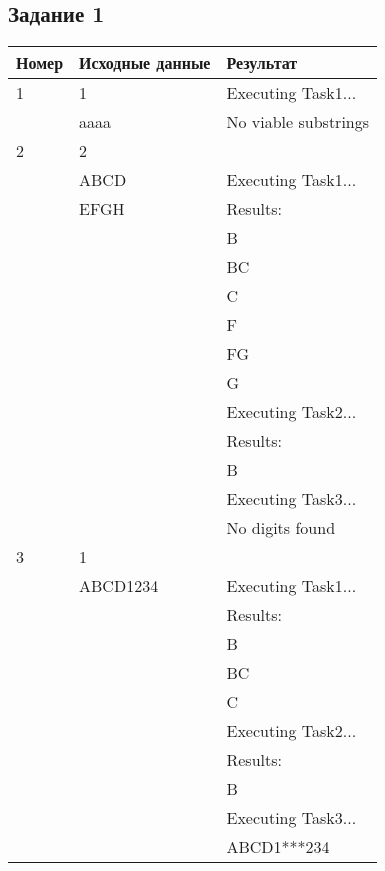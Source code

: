 \subsection*{\centering Задание 1}
\begin{table}[H]
    \centering
    \begin{tabular}{|l|l|l|}
        \hline
        Номер & Исходные данные & Результат\\[2ex] \hline
        1     & 1               & Executing Task1...\\
              & aaaa            & No viable substrings\\[2ex]\hline
        2     & 2               & \\
              & ABCD            & Executing Task1...\\
              & EFGH            & Results:\\
              &&B\\
              &&BC\\
              &&C\\
              &&F\\
              &&FG\\
              &&G\\
              &&Executing Task2...\\
              &&Results:\\
              &&B\\
              &&Executing Task3...\\
              &&No digits found\\[2ex]\hline
        3     & 1               & \\
              & ABCD1234        & Executing Task1...\\
              && Results:\\
              &&B\\
              &&BC\\
              &&C\\
              &&Executing Task2...\\
              &&Results:\\
              &&B\\
              &&Executing Task3...\\
              &&ABCD1***234\\[2ex]\hline
    \end{tabular}
\end{table}
\pagebreak

